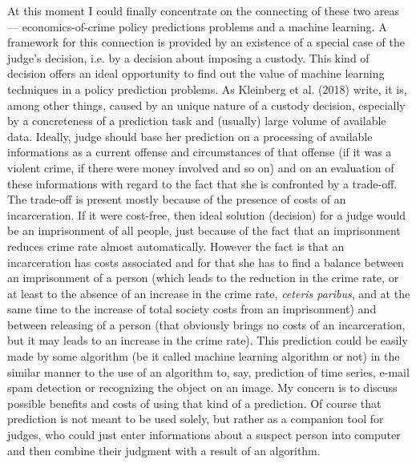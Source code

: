 \documentclass[12pt, twoside,openany]{book} %
\begin{document}
At this moment I could finally concentrate on the connecting of these two areas — economics-of-crime policy predictions problems and a machine learning. A framework for this connection is provided by an existence of a special case of the judge's decision, i.e. by a decision about imposing a custody. This kind of decision offers an ideal opportunity to find out the value of machine learning techniques in a policy prediction problems. As Kleinberg et al. (2018) write, it is, among other things, caused by an unique nature of a custody decision, especially by a concreteness of a prediction task and (usually) large volume of available data. Ideally, judge should base her prediction on a processing of available informations as a current offense and circumstances of that offense (if it was a violent crime, if there were money involved and so on) and on an evaluation of these informations with regard to the fact that she is confronted by a trade-off. The trade-off is present mostly because of the presence of costs of an incarceration. If it were cost-free, then ideal solution (decision) for a judge would be an imprisonment of all people, just because of the fact that an imprisonment reduces crime rate almost automatically. However the fact is that an incarceration has costs associated and for that she has to find a balance between an imprisonment of a person (which leads to the reduction in the crime rate, or at least to the absence of an increase in the crime rate, \textit{ceteris paribus}, and at the same time to the increase of total society costs from an imprisonment) and between releasing of a person (that obviously brings no costs of an incarceration, but it may leads to an increase in the crime rate). This prediction could be easily made by some algorithm (be it called machine learning algorithm or not) in the similar manner to the use of an algorithm to, say, prediction of time series, e-mail spam detection or recognizing the object on an image. My concern is to discuss possible benefits and costs of using that kind of a prediction. Of course that prediction is not meant to be used solely, but rather as a companion tool for judges, who could just enter informations about a suspect person into computer and then combine their judgment with a result of an algorithm. \newline
\end{document}
